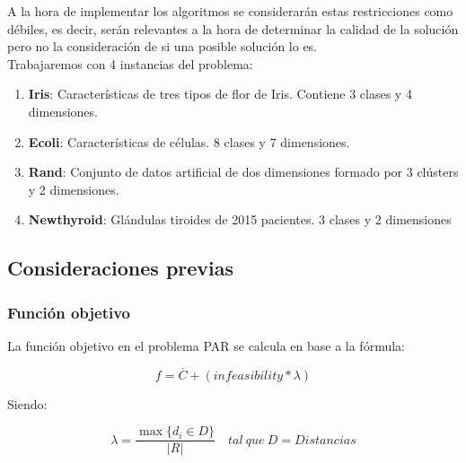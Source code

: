 A la hora de implementar los algoritmos se considerarán estas restricciones como débiles, es decir, serán relevantes a la hora de determinar la calidad de la solución pero no la consideración de si una posible solución lo es. \\

Trabajaremos con 4 instancias del problema:
\begin{enumerate}
    \item \textbf{Iris}: Características de tres tipos de flor de Iris. Contiene 3 clases y 4 dimensiones.
    \item \textbf{Ecoli}: Características de células. 8 clases y 7 dimensiones.
    \item \textbf{Rand}: Conjunto de datos artificial de dos dimensiones formado por 3 clústers y 2 dimensiones.
    \item \textbf{Newthyroid}: Glándulas tiroides de 2015 pacientes. 3 clases y 2 dimensiones
\end{enumerate}


\subsection{Consideraciones previas}

\subsubsection{Función objetivo}

La función objetivo en el problema PAR se calcula en base a la fórmula:

\begin{equation}
    f = \overline{C} + (infeasibility * \lambda)
\end{equation}

Siendo:

\begin{equation}
    \lambda = \frac{\max \{d_i \in D\}}{|R|} \quad tal\ que \ D = Distancias
\end{equation}

